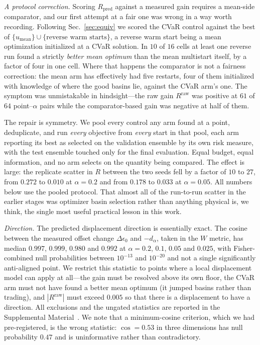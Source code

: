 \documentclass[aps,pra,twocolumn,superscriptaddress,reprint,nofootinbib,floatfix]{revtex4-2}
\theoremstyle{definition}
\newcommand{\umean}{u_{\mathrm{mean}}}
\newcommand{\SM}{Supplemental Material~\cite{SM}}
\begin{document}
\emph{A protocol correction.} Scoring $R_{\mathrm{pred}}$ against a measured
gain requires a mean-side comparator, and our first attempt at a fair one was
wrong in a way worth recording. Following Sec.~\ref{sec:equiv} we scored the
CVaR control against the best of $\{\umean\}\cup\{\text{reverse warm
starts}\}$, a reverse warm start being a mean optimization initialized at a
CVaR solution. In $10$ of $16$ cells at least one reverse run found a
strictly \emph{better mean optimum} than the mean multistart itself, by a
factor of four in one cell. Where that happens the comparator is not a
fairness correction: the mean arm has effectively had five restarts, four of
them initialized with knowledge of where the good basins lie, against the
CVaR arm's one. The symptom was unmistakable in hindsight---the raw gain
$R^{\mathrm{raw}}$ was positive at $61$ of $64$ point--$\alpha$ pairs while
the comparator-based gain was negative at half of them.

The repair is symmetry. We pool every control any arm found at a point,
deduplicate, and run \emph{every} objective from \emph{every} start in that
pool, each arm reporting its best as selected on the validation ensemble by
its own risk measure, with the test ensemble touched only for the final
evaluation. Equal budget, equal information, and no arm selects on the
quantity being compared. The effect is large: the replicate scatter in $R$
between the two seeds fell by a factor of $10$ to $27$, from $0.272$ to
$0.010$ at $\alpha=0.2$ and from $0.178$ to $0.033$ at $\alpha=0.05$. All
numbers below use the pooled protocol. That almost all of the run-to-run
scatter in the earlier stages was optimizer basin selection rather than
anything physical is, we think, the single most useful practical lesson in
this work.

\emph{Direction.} The predicted displacement direction is essentially exact.
The cosine between the measured offset change $\Delta\epsilon_0$ and
$-d_\alpha$, taken in the $W$ metric, has median $0.997$, $0.999$, $0.980$
and $0.992$ at $\alpha=0.2$, $0.1$, $0.05$ and $0.025$, with Fisher-combined
null probabilities between $10^{-13}$ and $10^{-20}$ and not a single
significantly anti-aligned point. We restrict this statistic to points where
a local displacement model can apply at all---the gain must be resolved above
its own floor, the CVaR arm must not have found a better mean optimum (it
jumped basins rather than trading), and $|R^{\mathrm{raw}}|$ must exceed
$0.005$ so that there is a displacement to have a direction. All exclusions
and the ungated statistics are reported in the \SM. We note that a
minimum-cosine criterion, which we had pre-registered, is the wrong
statistic: $\cos=0.53$ in three dimensions has null probability $0.47$ and is
uninformative rather than contradictory.
\end{document}
